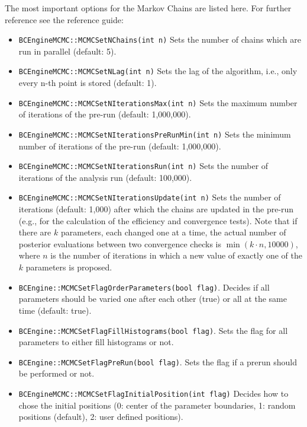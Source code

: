 \documentclass[11pt, a4paper]{article}
\begin{document}
The most important options for the Markov Chains are listed here. For
further reference see the reference guide:
%
\begin{itemize}

\item \verb|BCEngineMCMC::MCMCSetNChains(int n)| Sets the number of chains
  which are run in parallel (default: 5).

\item \verb|BCEngineMCMC::MCMCSetNLag(int n)| Sets the lag of the
  algorithm, i.e., only every n-th point is stored (default: 1).

\item \verb|BCEngineMCMC::MCMCSetNIterationsMax(int n)| Sets the maximum
  number of iterations of the pre-run (default: 1,000,000).

\item \verb|BCEngineMCMC::MCMCSetNIterationsPreRunMin(int n)| Sets the
  minimum number of iterations of the pre-run (default: 1,000,000).

\item \verb|BCEngineMCMC::MCMCSetNIterationsRun(int n)| Sets the number of
  iterations of the analysis run (default: 100,000).

\item \verb|BCEngineMCMC::MCMCSetNIterationsUpdate(int n)| Sets the number
  of iterations (default: 1,000) after which the chains are updated in
  the pre-run (e.g., for the calculation of the efficiency and
  convergence tests). Note that if there are $k$ parameters, each changed one
  at a time, the actual number of posterior evaluations between
  two convergence checks is $\min \left(k \cdot n, 10000\right)$, where $n$ is the number of iterations in
  which a new value of exactly one of the $k$ parameters is proposed.

\item \verb|BCEngine::MCMCSetFlagOrderParameters(bool flag)|. Decides
  if all parameters should be varied one after each other (true) or
  all at the same time (default: true).

\item \verb|BCEngine::MCMCSetFlagFillHistograms(bool flag)|. Sets the
  flag for all parameters to either fill histograms or not.

\item \verb|BCEngine::MCMCSetFlagPreRun(bool flag)|. Sets the flag if
  a prerun should be performed or not.

\item \verb|BCEngineMCMC::MCMCSetFlagInitialPosition(int flag)| Decides how
  to chose the initial positions (0: center of the parameter
  boundaries, 1: random positions (default), 2: user defined
  positions).


\end{itemize}
\end{document}
